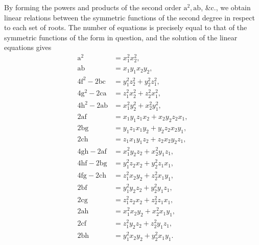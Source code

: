 \documentclass[11pt]{article}
\begin{document}
\medskip

\noindent By forming the powers and products of the second order $\mathrm{a}^2, \mathrm{ab}$, \&c., we obtain linear relations between the symmetric functions of the second degree in respect to each set of roots. The number of equations is precisely equal to that of the symmetric functions of the form in question, and the solution of the linear equations gives
\[
\begin{aligned}
\mathrm{a}^2 &= x_1^2 x_2^2,\\
\mathrm{ab} &= x_1 y_1 x_2 y_2,\\
4\mathrm{f}^2 - 2\mathrm{bc} &= y_1^2 z_2^2 + y_2^2 z_1^2,\\
4\mathrm{g}^2 - 2\mathrm{ca} &= z_1^2 x_2^2 + z_2^2 x_1^2,\\
4\mathrm{h}^2 - 2\mathrm{ab} &= x_1^2 y_2^2 + x_2^2 y_1^2,\\
2\mathrm{af} &= x_1 y_1 z_1 x_2 + x_2 y_2 z_2 x_1,\\
2\mathrm{bg} &= y_1 z_1 x_1 y_2 + y_2 z_2 x_2 y_1,\\
2\mathrm{ch} &= z_1 x_1 y_1 z_2 + z_2 x_2 y_2 z_1,\\
4\mathrm{gh} - 2\mathrm{af} &= x_1^2 y_2 z_2 + x_2^2 y_1 z_1,\\
4\mathrm{hf} - 2\mathrm{bg} &= y_1^2 z_2 x_2 + y_2^2 z_1 x_1,\\
4\mathrm{fg} - 2\mathrm{ch} &= z_1^2 x_2 y_2 + z_2^2 x_1 y_1,\\
2\mathrm{bf} &= y_1^2 y_2 z_2 + y_2^2 y_1 z_1,\\
2\mathrm{cg} &= z_1^2 z_2 x_2 + z_2^2 z_1 x_1,\\
2\mathrm{ah} &= x_1^2 x_2 y_2 + x_2^2 x_1 y_1,\\
2\mathrm{cf} &= z_1^2 y_2 z_2 + z_2^2 y_1 z_1,\\
2\mathrm{bh} &= y_1^2 x_2 y_2 + y_2^2 x_1 y_1.
\end{aligned}
\]

\medskip
\end{document}
